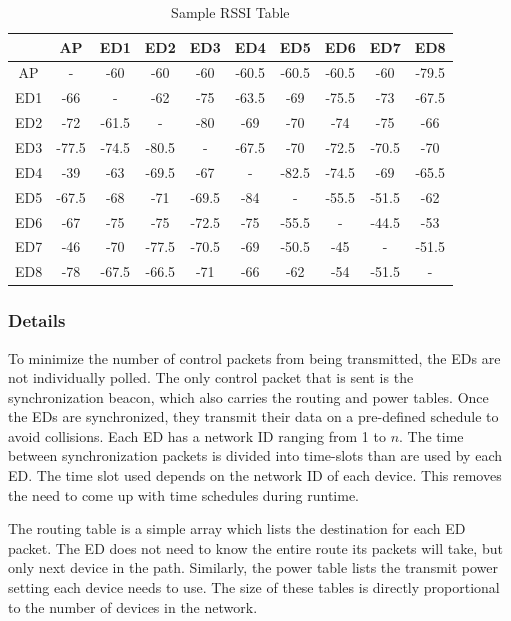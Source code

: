 \documentclass{article}
\begin{document}
\begin{table}[htb]
\begin{tabular}{|c|c|c|c|c|c|c|c|c|c|}
\hline  & AP & ED1 & ED2 & ED3 & ED4 & ED5 & ED6 & ED7 & ED8 \\ 
\hline AP & - & -60 & -60 & -60 & -60.5 & -60.5 & -60.5 & -60 & -79.5 \\ 
\hline ED1 & -66 & - & -62 & -75 & -63.5 & -69 & -75.5 & -73 & -67.5 \\ 
\hline ED2 & -72 & -61.5 & - & -80 & -69 & -70 & -74 & -75 & -66 \\ 
\hline ED3 & -77.5 & -74.5 & -80.5 & - & -67.5 & -70 & -72.5 & -70.5 & -70 \\ 
\hline ED4 & -39 & -63 & -69.5 & -67 & - & -82.5 & -74.5 & -69 & -65.5 \\ 
\hline ED5 & -67.5 & -68 & -71 & -69.5 & -84 & - & -55.5 & -51.5 & -62 \\ 
\hline ED6 & -67 & -75 & -75 & -72.5 & -75 & -55.5 & - & -44.5 & -53 \\ 
\hline ED7 & -46 & -70 & -77.5 & -70.5 & -69 & -50.5 & -45 & - & -51.5 \\ 
\hline ED8 & -78 & -67.5 & -66.5 & -71 & -66 & -62 & -54 & -51.5 & - \\ 
\hline 
\end{tabular} 
\caption{Sample RSSI Table}
\label{tab:rssi}
\end{table}


\subsubsection{Details}
To minimize the number of control packets from being transmitted, the EDs are not individually polled. The only control packet that is sent is the synchronization beacon, which also carries the routing and power tables. Once the EDs are synchronized, they transmit their data on a pre-defined schedule to avoid collisions. Each ED has a network ID ranging from 1 to $n$. The time between synchronization packets is divided into time-slots than are used by each ED. The time slot used depends on the network ID of each device. This removes the need to come up with time schedules during runtime.

The routing table is a simple array which lists the destination for each ED packet. The ED does not need to know the entire route its packets will take, but only next device in the path. Similarly, the power table lists the transmit power setting each device needs to use. The size of these tables is directly proportional to the number of devices in the network.
\end{document}
